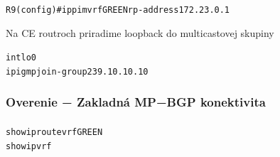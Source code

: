 \documentclass[12pt,twoside,a4paper]{report}
\begin{document}
\noindent
{\selectfont
\begin{small}
\begin{alltt}
R9(config)#ip pim vrf GREEN rp-address 172.23.0.1
\end{alltt}
\end{small}
}



Na CE routroch priradime loopback do multicastovej skupiny

\noindent
{\selectfont
\begin{small}
\begin{alltt}
int lo0
  ip igmp join-group 239.10.10.10
\end{alltt}
\end{small}
}





\subsubsection{Overenie − Zakladná MP−BGP konektivita}
\paragraph{}
\noindent
{\selectfont
\begin{small}
\begin{alltt}
show ip route vrf GREEN
show ip vrf
\end{alltt}
\end{small}
}
\end{document}
